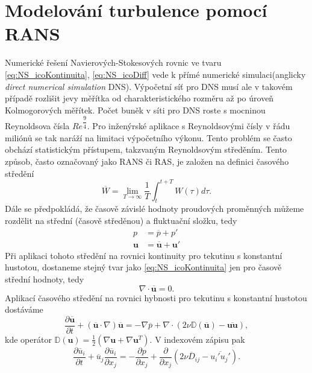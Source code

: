 \section{Modelování turbulence pomocí RANS}
Numerické řešení Navierových-Stokesových rovnic ve tvaru \ref{eq:NS_icoKontinuita}, \ref{eq:NS_icoDiff} vede k přímé numerické simulaci(anglicky \textit{direct numerical simulation} DNS). Výpočetní síť pro DNS musí ale v takovém případě rozlišit jevy měřítka od charakteristického rozměru až po úroveň Kolmogorových měřítek. Počet buněk v síti pro DNS roste s mocninou Reynoldsova čísla $ Re^{\dfrac{9}{4}} $. Pro inženýrské aplikace s Reynoldsovými čísly v řádu miliónů se tak naráží na limitaci výpočetního výkonu.
Tento problém se často obchází statistickým přístupem, takzvaným Reynoldsovým středěním\cite{dvorak1987vnitrniaerodynamika}. Tento způsob, často označovaný jako RANS či RAS, je založen na definici časového středění
\begin{equation}
\overline{W}=\lim\limits_{T\to\infty}\frac{1}{T}\int_{t}^{t+T}W(\tau)d\tau.
\end{equation}
Dále se předpokládá, že časově závislé hodnoty proudových proměnných můžeme rozdělit na střední (časově středěnou) a fluktuační složku, tedy
\begin{align}
p&=\overline{p}+p'\\
\mathbf{u} &= \overline{\mathbf{u}}+\mathbf{u}'
\end{align}
Při aplikaci tohoto středění na rovnici kontinuity pro tekutinu s konstantní hustotou, dostaneme stejný tvar jako \ref{eq:NS_icoKontinuita} jen pro časově střední hodnoty\cite{dvorak1987vnitrniaerodynamika}, tedy
\begin{equation}
\nabla \cdot \overline{\mathbf{u}} = 0.
\end{equation}
Aplikací časového středění na rovnici hybnosti pro tekutinu s konstantní hustotou dostáváme
\begin{equation}\label{eq:RANS_hybnostVekt}
\dfrac{\partial \overline{\mathbf{u}}}{\partial t} + (\overline{\mathbf{u}}\cdot \nabla) \overline{\mathbf{u}}=-\nabla\overline{p} +\nabla \cdot (2\nu \mathbb{D} (\overline{\mathbf{u}}) - \overline{\mathbf{u}\mathbf{u}}),
\end{equation}
kde operátor $ \mathbb{D}(\mathbf{u})=\frac{1}{2}(\nabla\mathbf{u}+\nabla\mathbf{u}^T) $. V indexovém zápisu pak
\begin{equation}
\frac{\partial \overline{u}_i}{\partial t} + \overline{u}_j\dfrac{\partial \overline{u}_i}{\partial x_j} = -\dfrac{\partial p}{\partial x_j} + 
\dfrac{\partial}{\partial x_j} \left(2\nu\overline{D}_{ij}-\overline{u_i' u_j'}\right).
\end{equation}

